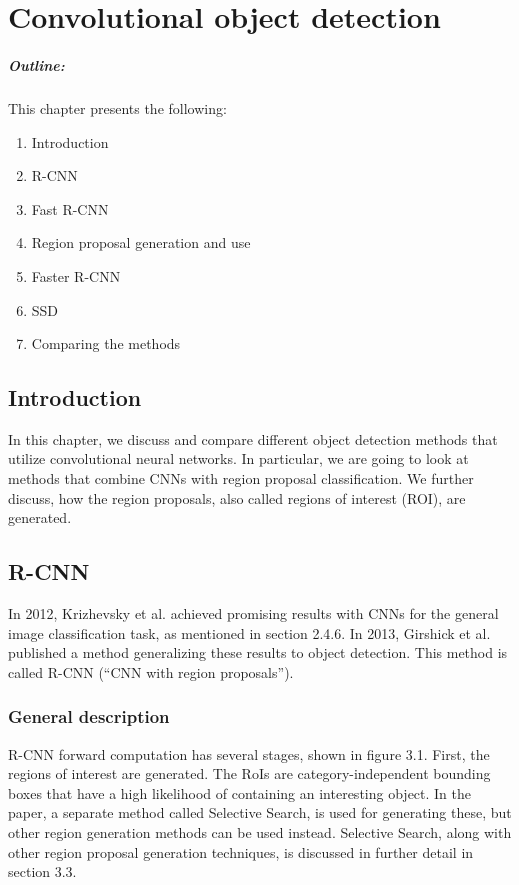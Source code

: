 \chapter{Convolutional object detection}\label{chap3}

\vspace*{50 ex}

\paragraph*{Outline:} This chapter presents the following:
\begin{enumerate}
\setlength{\itemsep}{-0.3em}
\item Introduction
\item R-CNN
\item Fast R-CNN
\item Region proposal generation and use
\item Faster R-CNN
\item SSD
\item Comparing the methods
\end{enumerate}
\newpage

\section{Introduction}\label{chap3:intro}
In this chapter, we discuss and compare different object detection methods that utilize convolutional neural networks. In particular, we are going to look at methods that combine CNNs with region proposal classification. We further discuss, how the region proposals, also called regions of interest (ROI), are generated.

\section{R-CNN}
In 2012, Krizhevsky et al. achieved promising results with CNNs for the general image classification task, as mentioned in section 2.4.6. In 2013, Girshick et al. published a method generalizing these results to object detection. This method is called R-CNN (“CNN with region proposals”).

\subsection{General description}
R-CNN forward computation has several stages, shown in figure 3.1. First, the regions of interest are generated. The RoIs are category-independent bounding boxes that have a high likelihood of containing an interesting object. In the paper, a separate method called Selective Search, is used for generating these, but other region generation methods can be used instead. Selective Search, along with other region proposal generation techniques, is discussed in further detail in section 3.3.

